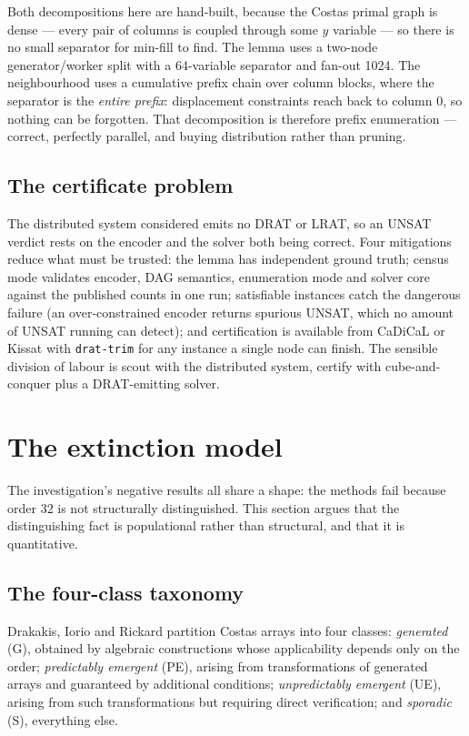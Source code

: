 \documentclass[11pt,a4paper]{article}
\theoremstyle{definition}
\begin{document}
Both decompositions here are hand-built, because the Costas primal graph is dense
--- every pair of columns is coupled through some $y$ variable --- so there is no
small separator for min-fill to find. The lemma uses a two-node generator/worker
split with a 64-variable separator and fan-out 1024. The neighbourhood uses a
cumulative prefix chain over column blocks, where the separator is the
\emph{entire prefix}: displacement constraints reach back to column 0, so nothing
can be forgotten. That decomposition is therefore prefix enumeration --- correct,
perfectly parallel, and buying distribution rather than pruning.

\subsection{The certificate problem}

The distributed system considered emits no DRAT or LRAT, so an UNSAT verdict
rests on the encoder and the solver both being correct. Four mitigations reduce
what must be trusted: the lemma has independent ground truth; census mode
validates encoder, DAG semantics, enumeration mode and solver core against the
published counts in one run; satisfiable instances catch the dangerous failure
(an over-constrained encoder returns spurious UNSAT, which no amount of UNSAT
running can detect); and certification is available from CaDiCaL or Kissat with
\texttt{drat-trim} for any instance a single node can finish. The sensible
division of labour is scout with the distributed system, certify with
cube-and-conquer plus a DRAT-emitting solver.


\section{The extinction model}
\label{sec:extinction}

The investigation's negative results all share a shape: the methods fail because
order 32 is not structurally distinguished. This section argues that the
distinguishing fact is populational rather than structural, and that it is
quantitative.

\subsection{The four-class taxonomy}

Drakakis, Iorio and Rickard partition Costas arrays into four classes:
\emph{generated} (G), obtained by algebraic constructions whose applicability
depends only on the order; \emph{predictably emergent} (PE), arising from
transformations of generated arrays and guaranteed by additional conditions;
\emph{unpredictably emergent} (UE), arising from such transformations but
requiring direct verification; and \emph{sporadic} (S), everything else.
\end{document}
